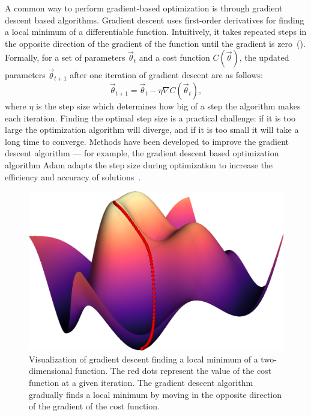 A common way to perform gradient-based optimization is through gradient descent based algorithms.
Gradient descent uses first-order derivatives for finding a local minimum of a differentiable function.
Intuitively, it takes repeated steps in the opposite direction of the gradient of the function until the gradient is zero~().
Formally, for a set of parameters $\vec{\theta}_t$ and a cost function $C(\vec{\theta})$, the updated parameters $\vec{\theta}_{t+1}$ after one iteration of gradient descent are as follows:
\begin{equation}
\vec{\theta}_{t+1} = \vec{\theta}_t - \eta\nabla C(\vec{\theta}_t),
\end{equation}
where $\eta$ is the step size which determines how big of a step the algorithm makes each iteration.
Finding the optimal step size is a practical challenge: if it is too large the optimization algorithm will diverge, and if it is too small it will take a long time to converge.
Methods have been developed to improve the gradient descent algorithm --- for example, the gradient descent based optimization algorithm Adam adapts the step size during optimization to increase the efficiency and accuracy of solutions~\cite{kingma2014adam}.

\begin{figure}[ht]
    \centering
    \includegraphics[width=0.45\linewidth]{figures/gradient_descent.png}
    \caption[Visualization of gradient descent finding a local minimum of a function.]{
        Visualization of gradient descent finding a local minimum of a two-dimensional function.
        The red dots represent the value of the cost function at a given iteration.
        The gradient descent algorithm gradually finds a local minimum by moving in the opposite direction of the gradient of the cost function.
    }
    \label{fig:gradient_descent}
\end{figure}

